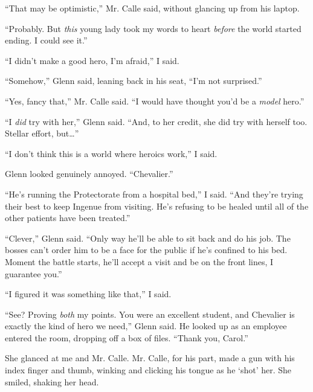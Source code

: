 ``That may be optimistic,'' Mr. Calle said, without glancing up from his laptop.



``Probably.  But \emph{this} young lady took my words to heart \emph{before} the world started ending.  I could see it.''



``I didn't make a good hero, I'm afraid,'' I said.



``Somehow,'' Glenn said, leaning back in his seat, ``I'm not surprised.''



``Yes, fancy that,'' Mr. Calle said.  ``I would have thought you'd be a \emph{model} hero.''



``I \emph{did }try with her,'' Glenn said.  ``And, to her credit, she did try with herself too.  Stellar effort, but\ldots''



``I don't think this is a world where heroics work,'' I said.



Glenn looked genuinely annoyed.  ``Chevalier.''



``He's running the Protectorate from a hospital bed,'' I said.  ``And they're trying their best to keep Ingenue from visiting.  He's refusing to be healed until all of the other patients have been treated.''



``Clever,'' Glenn said.  ``Only way he'll be able to sit back and do his job.  The bosses can't order him to be a face for the public if he's confined to his bed.  Moment the battle starts, he'll accept a visit and be on the front lines, I guarantee you.''



``I figured it was something like that,'' I said.



``See?  Proving \emph{both} my points.  You were an excellent student, and Chevalier is exactly the kind of hero we need,'' Glenn said.  He looked up as an employee entered the room, dropping off a box of files.  ``Thank you, Carol.''



She glanced at me and Mr. Calle.  Mr. Calle, for his part, made a gun with his index finger and thumb, winking and clicking his tongue as he `shot' her.  She smiled, shaking her head.



